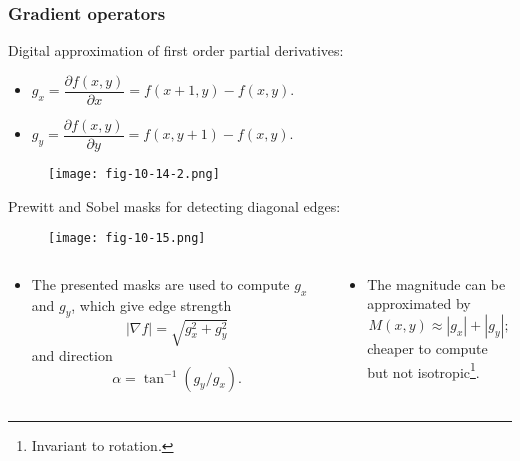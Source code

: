 \subsubsection{Gradient operators}

\begin{frame}
Digital approximation of first order partial derivatives:
\begin{itemize}
\item $g_{x} = \dfrac{\partial f(x,y)}{\partial x} = f(x+1, y) - f(x, y)$.
\item $g_{y} = \dfrac{\partial f(x,y)}{\partial y} = f(x, y + 1) - f(x, y)$.
\end{itemize}
\end{frame}

\begin{frame}
\begin{figure}[!h]
\texttt{[image: fig-10-14-2.png]}
\end{figure}
\end{frame}

\begin{frame}
Prewitt and Sobel masks for detecting diagonal edges:
\begin{figure}[!h]
\texttt{[image: fig-10-15.png]}
\end{figure}
\end{frame}

\begin{frame}
\begin{columns}
\begin{column}{.5\textwidth}
\begin{itemize}
\item The presented masks are used to compute $g_{x}$ and $g_{y}$, which give edge strength \[|\nabla f| = \sqrt{g_{x}^{2} + g_{y}^{2}}\] and direction \[\alpha = \tan^{-1}(g_{y}/g_{x}).\]
\end{itemize}
\end{column}
\begin{column}{.5\textwidth}
\begin{itemize}
\item The magnitude can be approximated by
\[
M(x,y) \approx |g_{x}| + |g_{y}|;
\]
cheaper to compute but not isotropic\footnote{Invariant to rotation.}.
\end{itemize}
\end{column}
\end{columns}
\end{frame}

